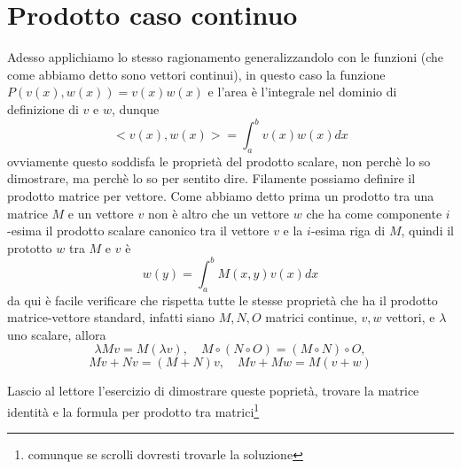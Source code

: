 \documentclass[11pt,a4paper]{report}
\theoremstyle{definition}
\theoremstyle{plain}
\theoremstyle{plain}
\begin{document}
		\section{Prodotto caso continuo}
			Adesso applichiamo lo stesso ragionamento generalizzandolo con le funzioni (che come abbiamo detto sono vettori continui), in questo caso la funzione $P(v(x),w(x))=v(x)w(x)$ e l'area è l'integrale nel dominio di definizione di $v$ e $w$, dunque
			\begin{equation}
				<v(x),w(x)>=\int_a^b v(x)w(x)dx
			\end{equation}
			ovviamente questo soddisfa le proprietà del prodotto scalare, non perchè lo so dimostrare, ma perchè lo so per sentito dire.\newline
			Filamente possiamo definire il prodotto matrice per vettore. Come abbiamo detto prima un prodotto tra una matrice $M$ e un vettore $v$ non è altro che un vettore $w$ che ha come componente $i$-esima il prodotto scalare canonico tra il vettore $v$ e la $i$-esima riga di $M$, quindi il prototto $w$ tra $M$ e $v$ è
			\begin{equation}
				w(y)=\int_a^b M(x,y)v(x) dx
			\end{equation}
			da qui è facile verificare che rispetta tutte le stesse proprietà che ha il prodotto matrice-vettore standard, infatti siano $M, N, O$ matrici continue, $v,w$ vettori, e $\lambda$ uno scalare, allora 
			\begin{equation}
				\lambda Mv= M(\lambda v),\quad M\circ (N \circ O)= (M \circ N) \circ O,
			\end{equation}
			\[
				Mv + Nv=  (M+N)v,\quad Mv+Mw=M(v+w)
			\]
			
			Lascio al lettore l'esercizio di dimostrare queste poprietà, trovare la matrice identità e la formula per prodotto tra matrici\footnote{comunque se scrolli dovresti trovarle la soluzione}
		
\end{document}
